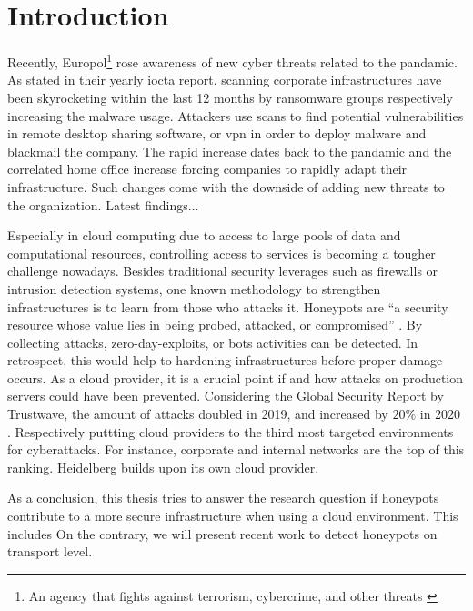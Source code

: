 \chapter{Introduction}

Recently, Europol\footnote{An agency that fights against terrorism, cybercrime, and other threats \cite{europol2021}} rose awareness of new cyber threats related to the pandamic.
As stated in their yearly \ac{iocta} report, scanning corporate infrastructures have been skyrocketing within the last 12 months by ransomware groups respectively increasing the malware usage.
Attackers use scans to find potential vulnerabilities in remote desktop sharing software, or \ac{vpn} in order to deploy malware and blackmail the company. \cite{iocta2020}
The rapid increase dates back to the pandamic and the correlated home office increase forcing companies to rapidly adapt their infrastructure.
Such changes come with the downside of adding new threats to the organization.
Latest findings...

Especially in cloud computing due to access to large pools of data and computational resources, controlling access to services is becoming a tougher challenge nowadays.
Besides traditional security leverages such as firewalls or intrusion detection systems, one known methodology to strengthen infrastructures is to learn from those who attacks it.
Honeypots are \enquote{a security resource whose value lies in being probed, attacked, or compromised} \cite{Spitzner2003}.
By collecting attacks, zero-day-exploits, or bots activities can be detected.
In retrospect, this would help to hardening infrastructures before proper damage occurs.
As a cloud provider, it is a crucial point if and how attacks on production servers could have been prevented.
Considering the Global Security Report by Trustwave, the amount of attacks doubled in 2019, and increased by $20\%$ in 2020 \cite{fahim2020}.
Respectively puttting cloud providers to the third most targeted environments for cyberattacks.
For instance, corporate and internal networks are the top of this ranking.
Heidelberg builds upon its own cloud provider.

As a conclusion, this thesis tries to answer the research question if honeypots contribute to a more secure infrastructure when using a cloud environment.
This includes 
On the contrary, we will present recent work to detect honeypots on transport level.



